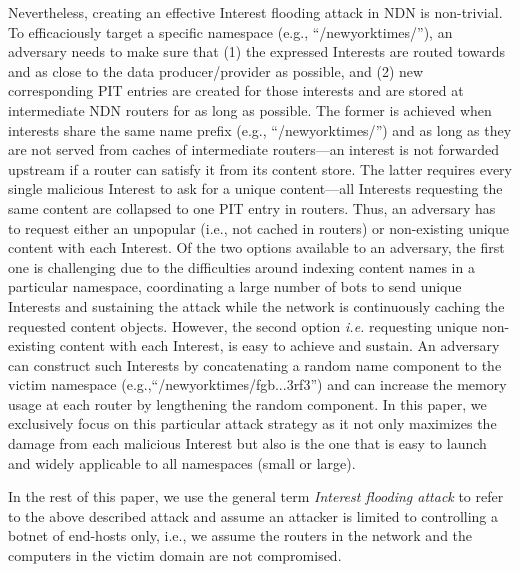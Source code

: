 \documentclass[10pt,conference]{IEEEtran}
\newcommand{\ndnName}[1]{``{\nicettfont #1}''}
\begin{document}
Nevertheless, creating an effective Interest flooding attack in NDN is non-trivial.
To efficaciously target a specific namespace (e.g., \ndnName{/newyorktimes/}), an adversary needs to make sure that (1) the expressed Interests are routed towards and as close to the data producer/provider as possible, and (2) new corresponding PIT entries are created for those interests and are stored at intermediate NDN routers for as long as possible. The former is achieved when interests share the same name prefix (e.g., \ndnName{/newyorktimes/}) and as long as they are not served from caches of intermediate routers---an interest is not forwarded upstream if a router can satisfy it from its content store. The latter requires every single malicious Interest to ask for a unique content---all Interests requesting the same content are collapsed to one PIT entry in routers. Thus, an adversary has to request either an unpopular (i.e., not cached in routers) or non-existing unique content with each Interest. Of the two options available to an adversary, the first one is challenging due to the difficulties around indexing content names in a particular namespace, coordinating a large number of bots to send unique Interests and sustaining the attack while the network is continuously caching the requested content objects. However, the second option {\it i.e.} requesting unique non-existing content with each Interest, is easy to achieve and sustain. An adversary can construct such Interests by concatenating a random name component to the victim namespace (e.g.,\ndnName{/newyorktimes/fgb...3rf3}) and can increase the memory usage at each router by lengthening the random component. In this paper, we exclusively focus on this particular attack strategy as it not only maximizes the damage from each malicious Interest but also is the one that is easy to launch and widely applicable to all namespaces (small or large). %

In the rest of this paper, we use the general term \emph{Interest flooding attack} to refer to the above described attack and assume an attacker is limited to controlling a botnet of end-hosts only, i.e., we assume the routers in the network and the computers in the victim domain are not compromised.

\end{document}
